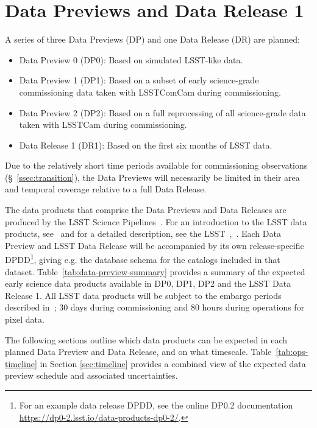 \section{Data Previews and Data Release 1}
\label{sec:datapreview}

A series of three Data Previews (DP) and one Data Release (DR) are planned:
\begin{itemize}
\item Data Preview 0 (DP0): Based on simulated LSST-like data.
\item Data Preview 1 (DP1): Based on a subset of early science-grade commissioning data taken with LSSTComCam during commissioning.
\item Data Preview 2 (DP2): Based on a full reprocessing of all science-grade data taken with LSSTCam during commissioning.
\item Data Release 1 (DR1): Based on the first six months of LSST data.
\end{itemize}
Due to the relatively short time periods available for commissioning observations (\S~\ref{ssec:transition}), the Data Previews will necessarily be limited in their area and temporal coverage relative to a full Data Release.

The data products that comprise the Data Previews and Data Releases are produced by the LSST Science Pipelines~\citep{2019ASPC..523..521B,2018PASJ...70S...5B}.
For an introduction to the LSST data products, see~\citet{RubinDataProductsAbridged} and for a detailed description, see the LSST~\dpdd{},~.
Each Data Preview and LSST Data Release will be accompanied by its own release-specific DPDD\footnote{For an example data release DPDD, see the online DP0.2 documentation {\url{https://dp0-2.lsst.io/data-products-dp0-2/}}.}, giving e.g. the  database schema for the catalogs included in that dataset.
Table~\ref{tab:data-preview-summary} provides a summary of the expected early science data products available in DP0, DP1, DP2 and the LSST Data Release 1.
All LSST data products will be subject to the embargo periods described in~; 30 days during commissioning and 80 hours during operations for pixel data.


The following sections outline which data products can be expected in each planned Data Preview and Data Release, and on what timescale.
Table~\ref{tab:ops-timeline} in Section  \ref{sec:timeline} provides a combined view of the expected data preview schedule and associated uncertainties.

